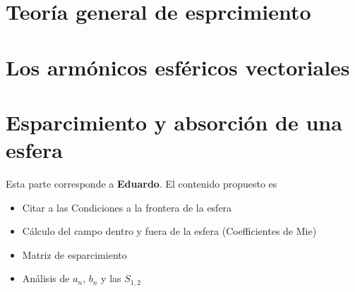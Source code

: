 \documentclass[12pts,a4paper]{book}
\begin{document}
\chapter{Teoría general de esprcimiento}
\label{ch:EsparcimientoGral} %






\chapter{Los armónicos esféricos vectoriales}
\label{ch:AEV} 







\chapter{Esparcimiento y absorción de una esfera}
\label{ch:AEV} %
Esta parte corresponde a \textbf{Eduardo}. El contenido propuesto es

\begin{itemize}
 \item Citar a las Condiciones a la frontera de la esfera
 \item Cálculo del campo dentro y fuera de la esfera (Coefficientes de Mie)
 \item Matriz de esparcimiento
 \item Análisis de $a_n$, $b_n$ y las $S_{1,2}$
\end{itemize}
\end{document}
